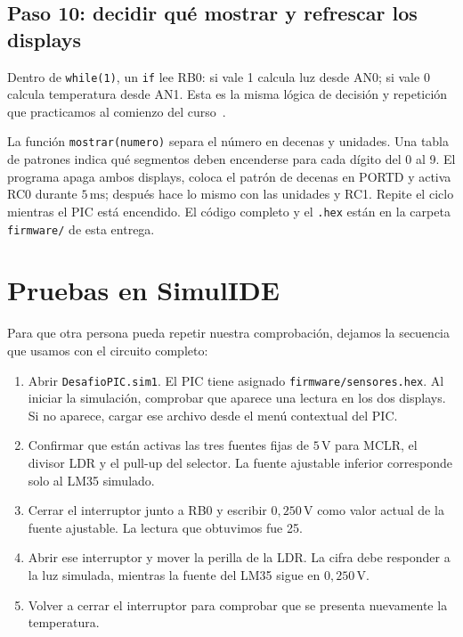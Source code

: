 \documentclass[11pt,a4paper]{article}
\begin{document}
\subsection{Paso 10: decidir qué mostrar y refrescar los displays}

Dentro de \texttt{while(1)}, un \texttt{if} lee RB0: si vale 1 calcula luz desde AN0; si vale 0 calcula temperatura desde AN1. Esta es la misma lógica de decisión y repetición que practicamos al comienzo del curso~\cite{clasec}.

La función \texttt{mostrar(numero)} separa el número en decenas y unidades. Una tabla de patrones indica qué segmentos deben encenderse para cada dígito del 0 al 9. El programa apaga ambos displays, coloca el patrón de decenas en PORTD y activa RC0 durante \(5\,\mathrm{ms}\); después hace lo mismo con las unidades y RC1. Repite el ciclo mientras el PIC está encendido. El código completo y el \texttt{.hex} están en la carpeta \texttt{firmware/} de esta entrega.

\section{Pruebas en SimulIDE}

Para que otra persona pueda repetir nuestra comprobación, dejamos la secuencia que usamos con el circuito completo:

\begin{enumerate}
  \item Abrir \texttt{DesafioPIC.sim1}. El PIC tiene asignado \texttt{firmware/sensores.hex}. Al iniciar la simulación, comprobar que aparece una lectura en los dos displays. Si no aparece, cargar ese archivo desde el menú contextual del PIC.
  \item Confirmar que están activas las tres fuentes fijas de \(5\,\mathrm V\) para MCLR, el divisor LDR y el pull-up del selector. La fuente ajustable inferior corresponde solo al LM35 simulado.
  \item Cerrar el interruptor junto a RB0 y escribir \(0{,}250\,\mathrm V\) como valor actual de la fuente ajustable. La lectura que obtuvimos fue 25.
  \item Abrir ese interruptor y mover la perilla de la LDR. La cifra debe responder a la luz simulada, mientras la fuente del LM35 sigue en \(0{,}250\,\mathrm V\).
  \item Volver a cerrar el interruptor para comprobar que se presenta nuevamente la temperatura.
\end{enumerate}
\end{document}
